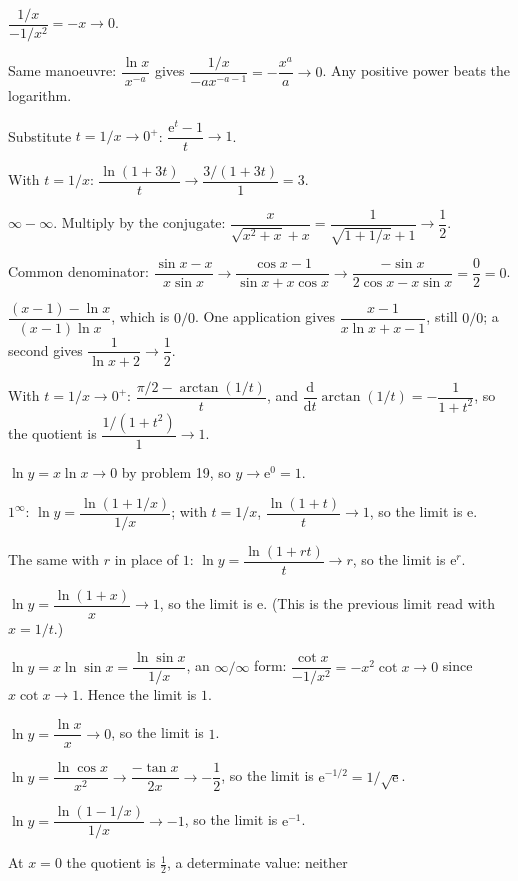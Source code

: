 \begin{solutions}
        $\dfrac{1/x}{-1/x^{2}}=-x\to0$.
  \item Same manoeuvre: $\dfrac{\ln x}{x^{-a}}$ gives
        $\dfrac{1/x}{-ax^{-a-1}}=-\dfrac{x^{a}}{a}\to0$. Any positive
        power beats the logarithm.
  \item Substitute $t=1/x\to0^{+}$:
        $\dfrac{\mathrm{e}^{t}-1}{t}\to1$.
  \item With $t=1/x$: $\dfrac{\ln(1+3t)}{t}\to
        \dfrac{3/(1+3t)}{1}=3$.
  \item $\infty-\infty$. Multiply by the conjugate:
        $\dfrac{x}{\sqrt{x^{2}+x}+x}=
        \dfrac{1}{\sqrt{1+1/x}+1}\to\dfrac12$.
  \item Common denominator:
        $\dfrac{\sin x-x}{x\sin x}\to\dfrac{\cos x-1}{\sin x+x\cos x}
        \to\dfrac{-\sin x}{2\cos x-x\sin x}=\dfrac{0}{2}=0$.
  \item $\dfrac{(x-1)-\ln x}{(x-1)\ln x}$, which is $0/0$. One
        application gives $\dfrac{x-1}{x\ln x+x-1}$, still $0/0$; a second
        gives $\dfrac{1}{\ln x+2}\to\dfrac12$.
  \item With $t=1/x\to0^{+}$:
        $\dfrac{\pi/2-\arctan(1/t)}{t}$, and
        $\dfrac{\mathrm{d}}{\mathrm{d}t}\arctan(1/t)=-\dfrac{1}{1+t^{2}}$,
        so the quotient is $\dfrac{1/(1+t^{2})}{1}\to1$.
  \item $\ln y=x\ln x\to0$ by problem 19, so $y\to\mathrm{e}^{0}=1$.
  \item $1^{\infty}$: $\ln y=\dfrac{\ln(1+1/x)}{1/x}$; with $t=1/x$,
        $\dfrac{\ln(1+t)}{t}\to1$, so the limit is $\mathrm{e}$.
  \item The same with $r$ in place of $1$:
        $\ln y=\dfrac{\ln(1+rt)}{t}\to r$, so the limit is
        $\mathrm{e}^{r}$.
  \item $\ln y=\dfrac{\ln(1+x)}{x}\to1$, so the limit is $\mathrm{e}$.
        (This is the previous limit read with $x=1/t$.)
  \item $\ln y=x\ln\sin x=\dfrac{\ln\sin x}{1/x}$, an
        $\infty/\infty$ form:
        $\dfrac{\cot x}{-1/x^{2}}=-x^{2}\cot x\to0$ since
        $x\cot x\to1$. Hence the limit is $1$.
  \item $\ln y=\dfrac{\ln x}{x}\to0$, so the limit is $1$.
  \item $\ln y=\dfrac{\ln\cos x}{x^{2}}\to
        \dfrac{-\tan x}{2x}\to-\dfrac12$, so the limit is
        $\mathrm{e}^{-1/2}=1/\sqrt{\mathrm{e}}$.
  \item $\ln y=\dfrac{\ln(1-1/x)}{1/x}\to-1$, so the limit is
        $\mathrm{e}^{-1}$.
  \item At $x=0$ the quotient is $\tfrac12$, a determinate value: neither

\end{solutions}
